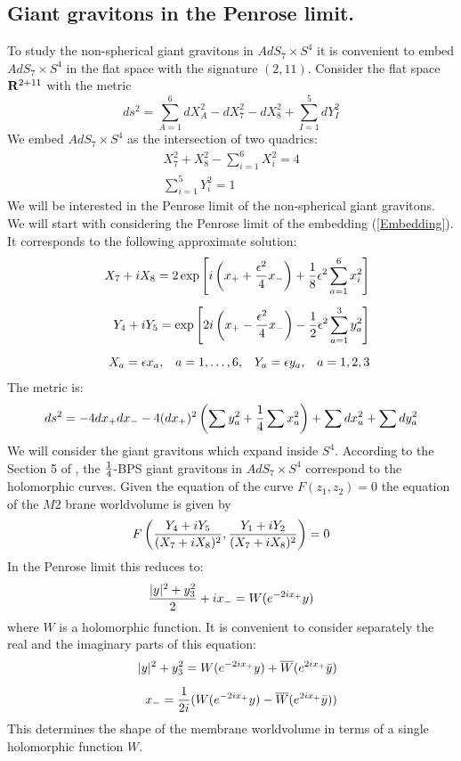 \documentclass[a4paper,12pt]{article}
\begin{document}
\subsection{Giant gravitons in the Penrose limit.}
To study the non-spherical giant gravitons in $AdS_7\times S^4$
it is convenient to embed $AdS_7\times S^4$ in the flat space with
the signature $(2,11)$.
Consider the flat space ${\bf R}^{2+11}$ with the metric
\begin{equation}
ds^2=\sum\limits_{A=1}^6 dX_A^2-dX_7^2-dX_8^2+
     \sum\limits_{I=1}^5 dY_I^2
\end{equation}
We embed $AdS_7\times S^4$ as the intersection of two
quadrics:
\begin{equation}\label{Embedding}
\begin{array}{r}
X_7^2+X_8^2-\sum\limits_{i=1}^6 X_i^2=4\\
\sum\limits_{i=1}^5 Y_i^2=1
\end{array}
\end{equation}
We will be interested in the Penrose limit of the non-spherical giant
gravitons. We will start with considering the Penrose limit of the embedding
(\ref{Embedding}). It corresponds to the following approximate solution:
\begin{eqnarray}
&& X_7+iX_8=2\exp\left[i\left(x_++{\epsilon^2\over 4}x_-\right)+
{1\over 8}\epsilon^2\sum\limits_{a=1}^6 x_i^2\right]\\[5pt]
&& Y_4+iY_5=\exp\left[2i\left(x_+-{\epsilon^2\over 4}x_-\right)-
{1\over 2}\epsilon^2\sum\limits_{a=1}^3 y_a^2\right]\\[5pt]
&& X_a=\epsilon x_a, \;\;\; a=1,\ldots,6,\;\;\;
   Y_a=\epsilon y_a, \;\;\; a=1,2,3
\end{eqnarray}
The metric is:
\begin{equation}
ds^2=-4dx_+ dx_--4 (dx_+)^2\left(\sum y_a^2 +{1\over 4}\sum x_a^2\right)
+\sum dx_a^2 + \sum dy_a^2
\end{equation}
We will consider the giant gravitons which expand inside $S^4$.
According to the Section 5 of \cite{AM}, the $1\over 4$-BPS giant gravitons
in $AdS_7\times S^4$ correspond to the holomorphic
curves. Given the equation of the curve $F(z_1,z_2)=0$ the equation of
the $M2$ brane worldvolume is given by
\begin{equation}\label{Curve}
F\left({Y_4+iY_5\over (X_7+iX_8)^2},{Y_1+iY_2\over (X_7+iX_8)^2}\right)=0
\end{equation}
In the Penrose limit this reduces to:
\begin{equation}\label{GGPenrose}
{|y|^2+y_3^2\over 2} + ix_- = W(e^{-2ix_+}y)
\end{equation}
where $W$ is a holomorphic function.
It is convenient to consider separately the real and the imaginary parts of
this equation:
\begin{eqnarray}
&& |y|^2+y_3^2=W(e^{-2ix_+}y)+\overline{W}(e^{2ix_+}\bar{y}) \\[5pt]
&& x_-={1\over 2i}(W(e^{-2ix_+}y)-\overline{W}(e^{2ix_+}\bar{y}))
\end{eqnarray}
This determines the shape of the membrane worldvolume in terms of a single
holomorphic function $W$.
\end{document}
